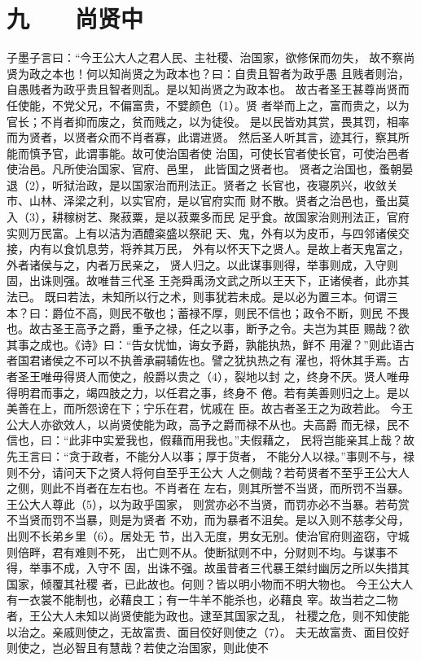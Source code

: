 \documentclass[12pt,UTF8]{ctexbook}
\begin{document}
\chapter{九　　尚贤中}

子墨子言曰：“今王公大人之君人民、主社稷、治国家，欲修保而勿失， 
故不察尚贤为政之本也！何以知尚贤之为政本也？曰：自贵且智者为政乎愚 
且贱者则治，自愚贱者为政乎贵且智者则乱。是以知尚贤之为政本也。 
故古者圣王甚尊尚贤而任使能，不党父兄，不偏富贵，不嬖颜色（1）。贤 
者举而上之，富而贵之，以为官长；不肖者抑而废之，贫而贱之，以为徒役。 
是以民皆劝其赏，畏其罚，相率而为贤者，以贤者众而不肖者寡，此谓进贤。 
然后圣人听其言，迹其行，察其所能而慎予官，此谓事能。故可使治国者使 
治国，可使长官者使长官，可使治邑者使治邑。凡所使治国家、官府、邑里， 
此皆国之贤者也。 
贤者之治国也，蚤朝晏退（2），听狱治政，是以国家治而刑法正。贤者之 
长官也，夜寝夙兴，收敛关市、山林、泽梁之利，以实官府，是以官府实而 
财不散。贤者之治邑也，蚤出莫入（3），耕稼树艺、聚菽粟，是以菽粟多而民 
足乎食。故国家治则刑法正，官府实则万民富。上有以洁为酒醴粢盛以祭祀 
天、鬼，外有以为皮币，与四邻诸侯交接，内有以食饥息劳，将养其万民， 
外有以怀天下之贤人。是故上者天鬼富之，外者诸侯与之，内者万民亲之， 
贤人归之。以此谋事则得，举事则成，入守则固，出诛则强。故唯昔三代圣 
王尧舜禹汤文武之所以王天下，正诸侯者，此亦其法已。 
既曰若法，未知所以行之术，则事犹若未成。是以必为置三本。何谓三 
本？曰：爵位不高，则民不敬也；蓄禄不厚，则民不信也；政令不断，则民 
不畏也。故古圣王高予之爵，重予之禄，任之以事，断予之令。夫岂为其臣 
赐哉？欲其事之成也。《诗》曰：“告女忧恤，诲女予爵，孰能执热，鲜不 
用濯？”则此语古者国君诸侯之不可以不执善承嗣辅佐也。譬之犹执热之有 
濯也，将休其手焉。古者圣王唯毋得贤人而使之，般爵以贵之（4），裂地以封 
之，终身不厌。贤人唯毋得明君而事之，竭四肢之力，以任君之事，终身不 
倦。若有美善则归之上。是以美善在上，而所怨谤在下；宁乐在君，忧戚在 
臣。故古者圣王之为政若此。 
今王公大人亦欲效人，以尚贤使能为政，高予之爵而禄不从也。夫高爵 
而无禄，民不信也，曰：“此非中实爱我也，假藉而用我也。”夫假藉之， 
民将岂能亲其上哉？故先王言曰：“贪于政者，不能分人以事；厚于货者， 
不能分人以禄。”事则不与，禄则不分，请问天下之贤人将何自至乎王公大 
人之侧哉？若苟贤者不至乎王公大人之侧，则此不肖者在左右也。不肖者在 
左右，则其所誉不当贤，而所罚不当暴。王公大人尊此（5），以为政乎国家， 
则赏亦必不当贤，而罚亦必不当暴。若苟赏不当贤而罚不当暴，则是为贤者 
不劝，而为暴者不沮矣。是以入则不慈孝父母，出则不长弟乡里（6）。居处无 
节，出入无度，男女无别。使治官府则盗窃，守城则倍畔，君有难则不死， 
出亡则不从。使断狱则不中，分财则不均。与谋事不得，举事不成，入守不 
固，出诛不强。故虽昔者三代暴王桀纣幽厉之所以失措其国家，倾覆其社稷 
者，已此故也。何则？皆以明小物而不明大物也。 
今王公大人有一衣裳不能制也，必藉良工；有一牛羊不能杀也，必藉良 
宰。故当若之二物者，王公大人未知以尚贤使能为政也。逮至其国家之乱， 
社稷之危，则不知使能以治之。亲戚则使之，无故富贵、面目佼好则使之（7）。 
夫无故富贵、面目佼好则使之，岂必智且有慧哉？若使之治国家，则此使不 
\end{document}

